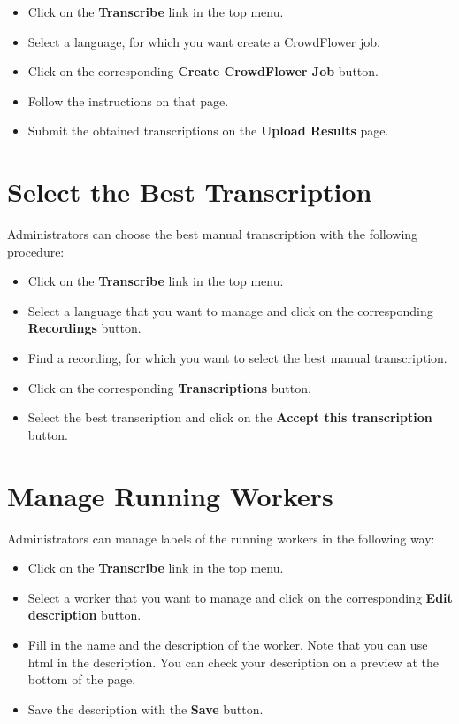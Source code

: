     \begin{itemize}
	\item Click on the \textbf{Transcribe} link in the top menu.
	\item Select a language, for which you want create a CrowdFlower job.
	\item Click on the corresponding \textbf{Create CrowdFlower Job} button.
	\item Follow the instructions on that page.
	\item Submit the obtained transcriptions on the \textbf{Upload Results} page.
    \end{itemize}

\section{Select the Best Transcription}
    Administrators can choose the best manual transcription with the following procedure:

    \begin{itemize}
	\item Click on the \textbf{Transcribe} link in the top menu.
	\item Select a language that you want to manage and click on the corresponding \textbf{Recordings} button.
	\item Find a recording, for which you want to select the best manual transcription.
	\item Click on the corresponding \textbf{Transcriptions} button.
	\item Select the best transcription and click on the \textbf{Accept this transcription} button.
    \end{itemize}


\section{Manage Running Workers}
    Administrators can manage labels of the running workers in the following way:

    \begin{itemize}
	\item Click on the \textbf{Transcribe} link in the top menu.
	\item Select a worker that you want to manage and click on the corresponding \textbf{Edit description} button.
	\item
	    Fill in the name and the description of the worker.
	    Note that you can use html in the description.
	    You can check your description on a preview at the bottom of the page.
	\item Save the description with the \textbf{Save} button.
    \end{itemize}
